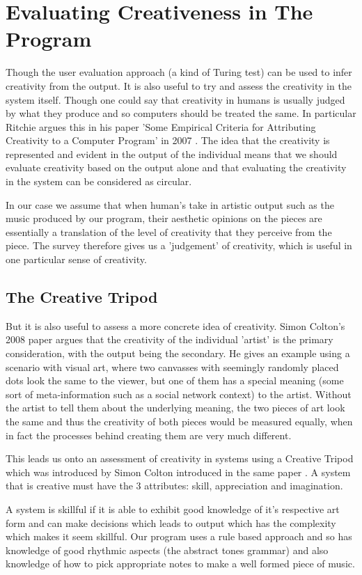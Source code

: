 \documentclass[pdftex,12pt,a4paper]{report}
\begin{document}
\section{Evaluating Creativeness in The Program}
Though the user evaluation approach (a kind of Turing test) can be used to infer creativity from the output. It is also useful to try and assess the creativity in the system itself. Though one could say that creativity in humans is usually judged by what they produce and so computers should be treated the same. In particular Ritchie argues this in his paper 'Some Empirical Criteria for Attributing Creativity to a Computer Program' in 2007 \cite{ritchie07}. The idea that the creativity is represented and evident in the output of the individual means that we should evaluate creativity based on the output alone and that evaluating the creativity in the system can be considered as circular.

In our case we assume that when human's take in artistic output such as the music produced by our program, their aesthetic opinions on the pieces are essentially a translation of the level of creativity that they perceive from the piece. The survey therefore gives us a 'judgement' of creativity, which is useful in one particular sense of creativity.

\subsection{The Creative Tripod}
But it is also useful to assess a more concrete idea of creativity. Simon Colton's 2008 paper \cite{colton08} argues that the creativity of the individual 'artist' is the primary consideration, with the output being the secondary. He gives an example using a scenario with visual art, where two canvasses with seemingly randomly placed dots look the same to the viewer, but one of them has a special meaning (some sort of meta-information such as a social network context) to the artist. Without the artist to tell them about the underlying meaning, the two pieces of art look the same and thus the creativity of both pieces would be measured equally, when in fact the processes behind creating them are very much different.

This leads us onto an assessment of creativity in systems using a Creative Tripod which was introduced by Simon Colton introduced in the same paper \cite{colton08}. A system that is creative must have the 3 attributes: skill, appreciation and imagination. 

A system is skillful if it is able to exhibit good knowledge of it's respective art form and can make decisions which leads to output which has the complexity which makes it seem skillful. Our program uses a rule based approach and so has knowledge of good rhythmic aspects (the abstract tones grammar) and also knowledge of how to pick appropriate notes to make a well formed piece of music. 
\end{document}
